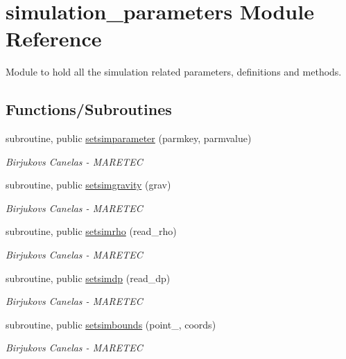 \hypertarget{namespacesimulation__parameters}{}\section{simulation\+\_\+parameters Module Reference}
\label{namespacesimulation__parameters}


Module to hold all the simulation related parameters, definitions and methods.  


\subsection*{Functions/\+Subroutines}
\begin{DoxyCompactItemize}
\item 
subroutine, public \mbox{\hyperlink{namespacesimulation__parameters_af905a4701f68f0ad0a50606101fda7d6}{setsimparameter}} (parmkey, parmvalue)
\begin{DoxyCompactList}\small\item\em Birjukovs Canelas -\/ M\+A\+R\+E\+T\+EC \end{DoxyCompactList}\item 
subroutine, public \mbox{\hyperlink{namespacesimulation__parameters_a21b04e29ccee801263abc6e27fba026f}{setsimgravity}} (grav)
\begin{DoxyCompactList}\small\item\em Birjukovs Canelas -\/ M\+A\+R\+E\+T\+EC \end{DoxyCompactList}\item 
subroutine, public \mbox{\hyperlink{namespacesimulation__parameters_a877176f5e4ba2c41a2514b824520f315}{setsimrho}} (read\+\_\+rho)
\begin{DoxyCompactList}\small\item\em Birjukovs Canelas -\/ M\+A\+R\+E\+T\+EC \end{DoxyCompactList}\item 
subroutine, public \mbox{\hyperlink{namespacesimulation__parameters_a757c1773e1c21deb9f3bfd2dc258bd1a}{setsimdp}} (read\+\_\+dp)
\begin{DoxyCompactList}\small\item\em Birjukovs Canelas -\/ M\+A\+R\+E\+T\+EC \end{DoxyCompactList}\item 
subroutine, public \mbox{\hyperlink{namespacesimulation__parameters_a71f285f54b412efac79d40c9ecd58037}{setsimbounds}} (point\+\_\+, coords)
\begin{DoxyCompactList}\small\item\em Birjukovs Canelas -\/ M\+A\+R\+E\+T\+EC \end{DoxyCompactList}\end{DoxyCompactItemize}
